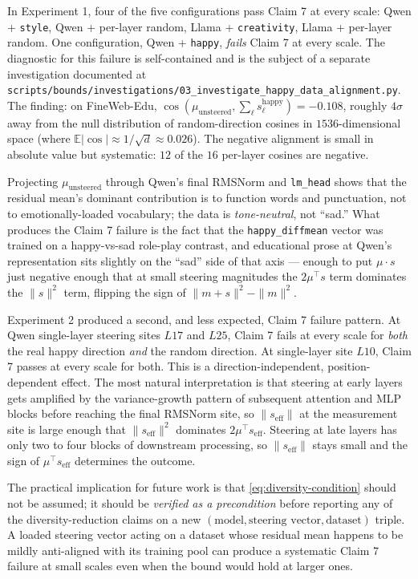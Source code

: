 In Experiment 1, four of the five configurations pass Claim 7 at every scale: Qwen + \texttt{style}, Qwen + per-layer random, Llama + \texttt{creativity}, Llama + per-layer random. One configuration, Qwen + \texttt{happy}, \emph{fails} Claim 7 at every scale. The diagnostic for this failure is self-contained and is the subject of a separate investigation documented at \texttt{scripts/bounds/investigations/03\_investigate\_happy\_data\_alignment.py}. The finding: on FineWeb-Edu, $\cos(\mu_\mathrm{unsteered}, \sum_{\ell} s^\mathrm{happy}_\ell) = -0.108$, roughly $4\sigma$ away from the null distribution of random-direction cosines in $1536$-dimensional space (where $\mathbb{E}|\cos| \approx 1/\sqrt{d} \approx 0.026$). The negative alignment is small in absolute value but systematic: $12$ of the $16$ per-layer cosines are negative.

Projecting $\mu_\mathrm{unsteered}$ through Qwen's final RMSNorm and \texttt{lm\_head} shows that the residual mean's dominant contribution is to function words and punctuation, not to emotionally-loaded vocabulary; the data is \emph{tone-neutral}, not ``sad.'' What produces the Claim 7 failure is the fact that the \texttt{happy\_diffmean} vector was trained on a happy-vs-sad role-play contrast, and educational prose at Qwen's representation sits slightly on the ``sad'' side of that axis --- enough to put $\mu \cdot s$ just negative enough that at small steering magnitudes the $2\mu^\top s$ term dominates the $\|s\|^2$ term, flipping the sign of $\|m+s\|^2 - \|m\|^2$.

Experiment 2 produced a second, and less expected, Claim 7 failure pattern. At Qwen single-layer steering sites $L17$ and $L25$, Claim 7 fails at every scale for \emph{both} the real happy direction \emph{and} the random direction. At single-layer site $L10$, Claim 7 passes at every scale for both. This is a direction-independent, position-dependent effect. The most natural interpretation is that steering at early layers gets amplified by the variance-growth pattern of subsequent attention and MLP blocks before reaching the final RMSNorm site, so $\|s_\mathrm{eff}\|$ at the measurement site is large enough that $\|s_\mathrm{eff}\|^2$ dominates $2\mu^\top s_\mathrm{eff}$. Steering at late layers has only two to four blocks of downstream processing, so $\|s_\mathrm{eff}\|$ stays small and the sign of $\mu^\top s_\mathrm{eff}$ determines the outcome.

The practical implication for future work is that \ref{eq:diversity-condition} should not be assumed; it should be \emph{verified as a precondition} before reporting any of the diversity-reduction claims on a new $(\text{model}, \text{steering vector}, \text{dataset})$ triple. A loaded steering vector acting on a dataset whose residual mean happens to be mildly anti-aligned with its training pool can produce a systematic Claim 7 failure at small scales even when the bound would hold at larger ones.

